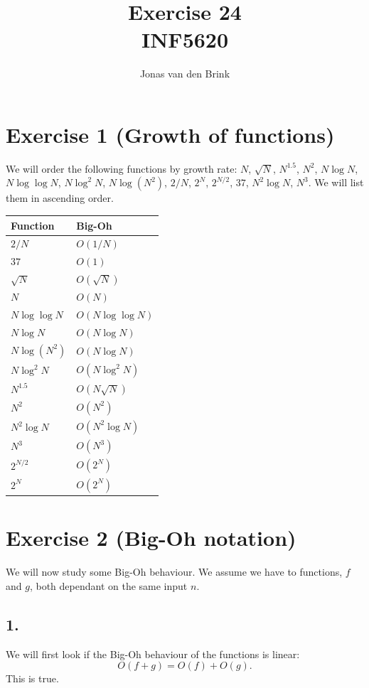 \documentclass[a4paper, 11pt, notitlepage, english]{article}
\author{Jonas van den Brink}
\title{Exercise 24 \\ INF5620}
\begin{document}
\maketitle

\section*{Exercise 1 (Growth of functions)}

We will order the following functions by growth rate: $N$, $\sqrt{N}$, $N^{1.5}$, $N^2$, $N\log N$, $N \log \log N$, $N \log^2 N$, $N \log(N^2)$, $2/N$, $2^N$, $2^{N/2}$, $37$, $N^2\log N$, $N^3$. We will list them in ascending order. 

\begin{center}
\begin{tabular}{ l | l }
Function & Big-Oh \\
\hline \hline
$2/N$ & $O(1/N)$ \\ \hline
$37$ & $O(1)$ \\ \hline
$\sqrt{N}$ & $O(\sqrt{N})$ \\ \hline
$N$ & $O(N)$ \\ \hline
$N \log \log N$ & $O(N \log \log N)$ \\ \hline 
$N \log N$ & $O(N \log N)$ \\ \hline
$N \log (N^2)$ &  $O(N \log N)$ \\ \hline 
$N \log^2 N$ & $O(N \log^2 N)$ \\ \hline 
$N^{1.5}$ & $O(N\sqrt{N})$ \\ \hline 
$N^2$ & $O(N^2)$ \\ \hline 
$N^2\log N$ & $O(N^2 \log N)$ \\ \hline 
$N^3$ & $O(N^3)$ \\ \hline 
$2^{N/2}$ & $O(2^N)$ \\ \hline 
$2^N$ & $O(2^N)$   
\end{tabular}
\end{center}

\clearpage

\section*{Exercise 2 (Big-Oh notation)}

We will now study some Big-Oh behaviour. We assume we have to functions, $f$ and $g$, both dependant on the same input $n$.

\subsection*{1.}
We will first look if the Big-Oh behaviour of the functions is linear:
$$O(f+g) = O(f) + O(g).$$
This is true.
\end{document}
